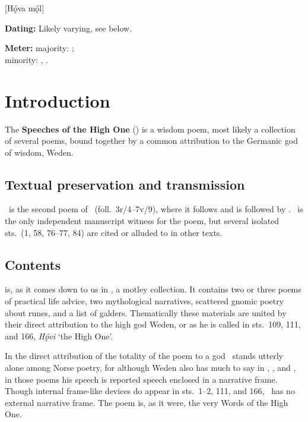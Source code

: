 [Hǫ́va mǫ́l]

\begin{flushright}%
\textbf{Dating:} Likely varying, see below.

\textbf{Meter:} majority: \Ljodahattr; \\
minority: \Malahattr, \Fornyrdislag.
\end{flushright}%

\section{Introduction}

The \textbf{Speeches of the High One} () is a wisdom poem, most likely a collection of several poems, bound together by a common attribution to the Germanic god of wisdom, Weden.

\subsection{Textual preservation and transmission}

\Havamal\ is the second poem of \Regius\ (foll.~3r/4--7v/9), where it follows  and is followed by .  \Regius\ is the only independent manuscript witness for the poem, but several isolated sts.~(1, 58, 76--77, 84) are cited or alluded to in other texts.

\subsection{Contents}

 is, as it comes down to us in \Regius, a motley collection.  It contains two or three poems of practical life advice, two mythological narratives, scattered gnomic poetry about runes, and a list of galders.
Thematically these materials are united by their direct attribution to the high god Weden, or as he is called in sts.~109, 111, and 166, \emph{Hǫ́vi} ‘the High One’.

In the direct attribution of the totality of the poem to a god \Havamal\ stands utterly alone among Norse poetry, for although Weden also has much to say in , , and , in those poems his speech is reported speech enclosed in a narrative frame.  Though internal frame-like devices do appear in sts.~1--2, 111, and 166, \Havamal\ has no external narrative frame.  The poem is, as it were, the very Words of the High One.

